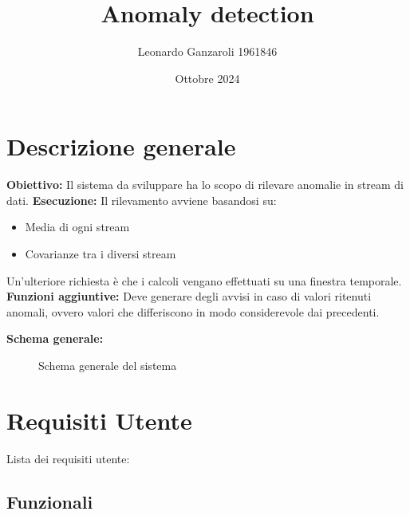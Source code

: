 \documentclass{article}
\title{Anomaly detection}
\author{Leonardo Ganzaroli 1961846}
\date{Ottobre 2024}
\begin{document}
\maketitle

\tableofcontents

\newpage

\section{Descrizione generale}
\fontsize{12pt}{14pt}\selectfont
\raggedright

\textbf{Obiettivo:} Il sistema da sviluppare ha lo scopo di rilevare anomalie in stream di dati. \vspace{3pt}
\newline
\textbf{Esecuzione:} Il rilevamento avviene basandosi su:
\vspace{3pt}
\begin{itemize}
    \item Media di ogni stream
    \item Covarianze tra i diversi stream
\end{itemize}
\vspace{3pt}
Un'ulteriore richiesta è che i calcoli vengano effettuati su una finestra temporale.
\vspace{3pt}
\newline
\textbf{Funzioni aggiuntive:} Deve generare degli avvisi in caso di valori ritenuti anomali, ovvero valori che differiscono in modo considerevole dai precedenti. 
\newline

\textbf{Schema generale:}

\vspace{10pt}

\begin{figure}[ht]
	\centering
	
	\caption{Schema generale del sistema}
	\label{fig:schema.svg}
\end{figure}

\newpage

\section{Requisiti Utente}

Lista dei requisiti utente:
\vspace{12pt}

\subsection{Funzionali}
\end{document}
